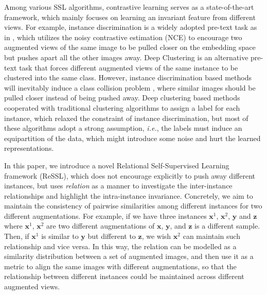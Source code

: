 \documentclass{article}
\newcommand{\<}{\left\langle}
\renewcommand{\>}{\right\rangle}
\newcommand{\ie}{{\emph{i.e.}}}
\begin{document}
Among various SSL algorithms, contrastive learning \cite{instance_discrimination, alignment_uniformity, simclr} serves as a state-of-the-art framework, which mainly focuses on learning an invariant feature from different views. For example, instance discrimination is a widely adopted pre-text task as in \cite{simclr, moco, instance_discrimination},  which utilizes the noisy contrastive estimation (NCE) to encourage two augmented views of the same image to be pulled closer on the embedding space but pushes apart all the other images away. Deep Clustering \cite{deepclustering, Self-labelling, swav} is an alternative pre-text task that forces different augmented views of the same instance to be clustered into the same class. However, instance discrimination based methods will inevitably induce a class collision problem \cite{contrastive_theory, PCL, debiased},  where similar images should be pulled closer instead of being pushed away. Deep clustering based methods cooperated with traditional clustering algorithms to assign a label for each instance, which relaxed the constraint of instance discrimination, but most of these algorithms adopt a strong assumption, \ie, the labels must induce an equipartition of the data, which might introduce some noise and hurt the learned representations.



In this paper, we introduce a novel Relational Self-Supervised Learning framework (ReSSL), which does not encourage explicitly to push away different instances, but uses \textit{relation} as a manner to investigate the inter-instance relationships and highlight the intra-instance invariance. Concretely, we aim to maintain the consistency of pairwise similarities among different instances for two different augmentations. For example, if we have three instances  $\mathbf{x}^1$, $\mathbf{x}^2$, $\mathbf{y}$ and $\mathbf{z}$ where $\mathbf{x}^1$, $\mathbf{x}^2$ are two different augmentations of $\mathbf{x}$,  $\mathbf{y}$, and $\mathbf{z}$ is a different sample. Then, if $\mathbf{x}^1$ is similar to $\mathbf{y}$ but different to $\mathbf{z}$, we wish $\mathbf{x}^2$ can maintain such relationship and vice versa. In this way, the relation can be modelled as a similarity distribution between a set of augmented images, and then use it as a metric to align the same images with different augmentations, so that the relationship between different instances could be maintained across different augmented views. 
\end{document}
